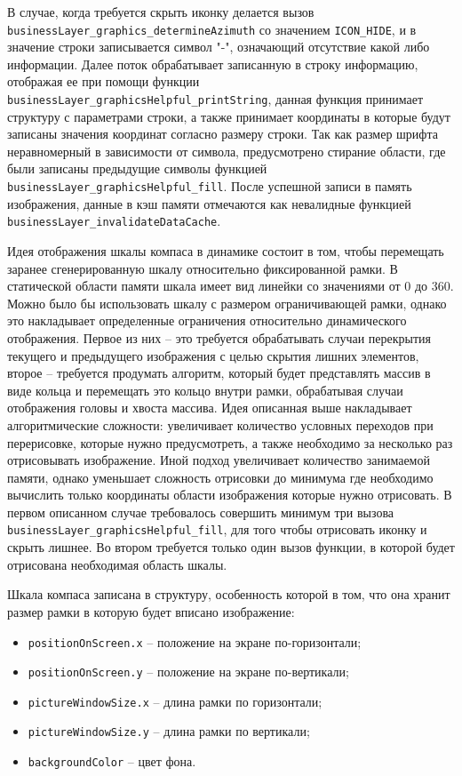 В случае, когда требуется скрыть иконку делается вызов \lstinline{businessLayer_graphics_determineAzimuth} со значением \lstinline{ICON_HIDE},
и в значение строки записывается символ "-", означающий отсутствие какой либо информации. Далее поток обрабатывает записанную в строку информацию, отображая ее
при помощи функции \lstinline{businessLayer_graphicsHelpful_printString}, данная функция принимает структуру с параметрами строки, а также принимает координаты
в которые будут записаны значения координат согласно размеру строки. Так как размер шрифта неравномерный в зависимости от символа, предусмотрено стирание области,
где были записаны предыдущие символы функцией \lstinline{businessLayer_graphicsHelpful_fill}. После успешной записи в память изображения, данные в кэш памяти
отмечаются как невалидные функцией \lstinline{businessLayer_invalidateDataCache}.

Идея отображения шкалы компаса в динамике состоит в том, чтобы перемещать заранее сгенерированную шкалу относительно фиксированной рамки. В статической области памяти
шкала имеет вид линейки со значениями от 0 до 360. Можно было бы использовать шкалу с размером ограничивающей рамки, однако это накладывает определенные ограничения относительно
динамического отображения. Первое из них -- это требуется обрабатывать случаи перекрытия текущего и предыдущего изображения с целью скрытия лишних элементов, второе --
требуется продумать алгоритм, который будет представлять массив в виде кольца и перемещать это кольцо внутри рамки, обрабатывая случаи отображения головы и хвоста массива.
Идея описанная выше накладывает алгоритмические сложности: увеличивает количество условных переходов при перерисовке, которые нужно предусмотреть, а также необходимо за несколько
раз отрисовывать изображение. Иной подход увеличивает количество занимаемой памяти, однако уменьшает сложность отрисовки до минимума где необходимо вычислить только координаты
области изображения которые нужно отрисовать. В первом описанном случае требовалось совершить минимум три вызова \lstinline{businessLayer_graphicsHelpful_fill}, для
того чтобы отрисовать иконку и скрыть лишнее. Во втором требуется только один вызов функции, в которой будет отрисована необходимая область шкалы.

Шкала компаса записана в структуру, особенность которой в том, что она хранит размер рамки в которую будет вписано изображение:

\begin{itemize}
    \item \lstinline{positionOnScreen.x} -- положение на экране по-горизонтали;
    \item \lstinline{positionOnScreen.y} -- положение на экране по-вертикали;
    \item \lstinline{pictureWindowSize.x} -- длина рамки по горизонтали;
    \item \lstinline{pictureWindowSize.y} -- длина рамки по вертикали;
    \item \lstinline{backgroundColor} -- цвет фона.
\end{itemize}

